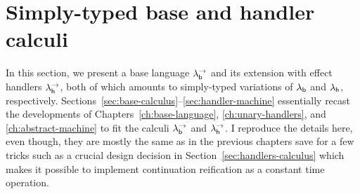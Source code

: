 \documentclass[12pt,phd,lfcs,twoside,openright,logo,leftchapter,normalheadings]{infthesis}
\theoremstyle{plain}
\theoremstyle{definition}
\begin{document}

\section{Simply-typed base and handler calculi}
\label{sec:calculi}
In this section, we present a base language $\lambda^\rightarrow_{\mathsf{b}}$ and its extension
with effect handlers $\lambda^\rightarrow_{\mathsf{h}}$, both of which amounts to simply-typed
variations of $\lambda_{\mathsf{b}}$ and $\lambda_{\mathsf{h}}$,
respectively. Sections~\ref{sec:base-calculus}--\ref{sec:handler-machine}
essentially recast the developments of
Chapters~\ref{ch:base-language}, \ref{ch:unary-handlers}, and
\ref{ch:abstract-machine} to fit the calculi $\lambda^\rightarrow_{\mathsf{b}}$ and $\lambda^\rightarrow_{\mathsf{h}}$. I
reproduce the details here, even though, they are mostly the same as
in the previous chapters save for a few tricks such as a crucial
design decision in Section~\ref{sec:handlers-calculus} which makes it
possible to implement continuation reification as a constant time
operation.
\end{document}
